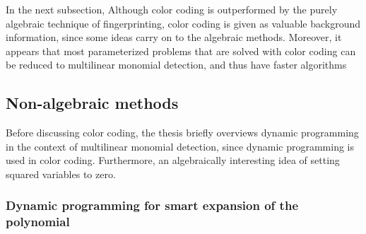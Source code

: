 In the next subsection,
Although color coding is outperformed by the 
purely algebraic technique of fingerprinting, color coding is given as valuable background information, 
since some ideas carry on to the algebraic methods. Moreover, 
it appears that most parameterized problems that are solved with color coding can be reduced to 
multilinear monomial detection, and thus have faster algorithms



\subsection{Non-algebraic methods}

Before discussing color coding, the thesis briefly overviews dynamic programming in the context of 
multilinear monomial detection, since dynamic programming is used in color coding. Furthermore, 
an algebraically interesting idea of setting squared variables to zero.

\subsubsection{Dynamic programming for smart expansion of the polynomial}

